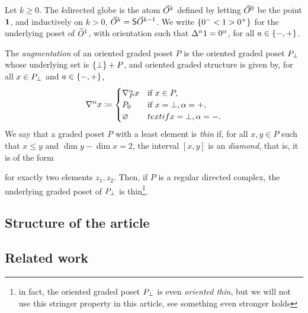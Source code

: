 Let \( k \geq 0 \).
The \( k \)\nbd directed globe is the atom \( \dglobe{k} \) defined by letting \( \dglobe{0} \) be the point \( \pt \), and inductively on \( k > 0 \), \( \dglobe{k} = \sus{\dglobe{k - 1}} \).
We write \( \set{0^- < 1 > 0^+} \) for the underlying poset of \( \rglobe{1} \), with orientation such that \( \faces{}{\a} 1 = 0^\a \), for all \( a \in \set{-, +} \).

The \emph{augmentation} of an oriented graded poset \( P \) is the oriented graded poset \( \augm{P} \) whose underlying set is \( \set{\bot} + P \), and oriented graded structure is given by, for all \( x \in \augm{P} \) and \( a \in \set{-, +} \),
\begin{equation*}
    \cofaces{}{\a} x \eqdef
    \begin{cases}
        \cofaces{P}{\a} x & \text{if } x \in P,\\
        \gr{0}{P} &\text{if } x = \bot, \a = +, \\
        \varnothing &text{if } x = \bot, \a = -.
    \end{cases}
\end{equation*}
We say that a graded poset \( P \) with a least element is \emph{thin} if, for all \( x, y \in P \) such that \( x \le y \) and \( \dim y - \dim x = 2 \), the interval \( [x, y] \) is an \emph{diamond}, that is, it is of the form 
\begin{center}
\end{center}
for exactly two elements \( z_1, z_2 \).
Then, if \( P \) is a regular directed complex, the underlying graded poset of \( \augm{P} \) is thin\footnote{in fact, the oriented graded poset \( \augm{P} \) is even \emph{oriented thin}, but we will not use this stringer property in this article, see \cite[2.3.10]{hadzihasanovic2024combinatorics} something even stronger holds}.

\subsection*{Structure of the article}

\subsection*{Related work}

